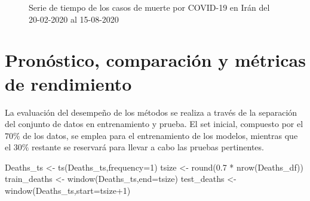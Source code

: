 \documentclass[
  us-letterpaper,
]{scrreprt}
\newenvironment{Shaded}{\begin{snugshade}}{\end{snugshade}}
\newcommand{\AttributeTok}[1]{\textcolor[rgb]{0.40,0.45,0.13}{#1}}
\newcommand{\DecValTok}[1]{\textcolor[rgb]{0.68,0.00,0.00}{#1}}
\newcommand{\FloatTok}[1]{\textcolor[rgb]{0.68,0.00,0.00}{#1}}
\newcommand{\FunctionTok}[1]{\textcolor[rgb]{0.28,0.35,0.67}{#1}}
\newcommand{\NormalTok}[1]{\textcolor[rgb]{0.00,0.23,0.31}{#1}}
\newcommand{\OtherTok}[1]{\textcolor[rgb]{0.00,0.23,0.31}{#1}}
\newcommand{\SpecialCharTok}[1]{\textcolor[rgb]{0.37,0.37,0.37}{#1}}
\theoremstyle{plain}
\theoremstyle{definition}
\theoremstyle{plain}
\theoremstyle{definition}
\theoremstyle{remark}
\begin{document}
\begin{figure}


\caption{\label{fig-muertespdf}Serie de tiempo de los casos de muerte
por COVID-19 en Irán del 20-02-2020 al 15-08-2020}

\end{figure}%

\section{Pronóstico, comparación y métricas de
rendimiento}\label{pronuxf3stico-comparaciuxf3n-y-muxe9tricas-de-rendimiento}

La evaluación del desempeño de los métodos se realiza a través de la
separación del conjunto de datos en entrenamiento y prueba. El set
inicial, compuesto por el \(70\%\) de los datos, se emplea para el
entrenamiento de los modelos, mientras que el \(30\%\) restante se
reservará para llevar a cabo las pruebas pertinentes.

\begin{Shaded}
\begin{Highlighting}[]
\NormalTok{Deaths\_ts }\OtherTok{\textless{}{-}} \FunctionTok{ts}\NormalTok{(Deaths\_ts,}\AttributeTok{frequency=}\DecValTok{1}\NormalTok{) }
\NormalTok{tsize }\OtherTok{\textless{}{-}} \FunctionTok{round}\NormalTok{(}\FloatTok{0.7} \SpecialCharTok{*} \FunctionTok{nrow}\NormalTok{(Deaths\_df)) }
\NormalTok{train\_deaths }\OtherTok{\textless{}{-}} \FunctionTok{window}\NormalTok{(Deaths\_ts,}\AttributeTok{end=}\NormalTok{tsize) }
\NormalTok{test\_deaths }\OtherTok{\textless{}{-}} \FunctionTok{window}\NormalTok{(Deaths\_ts,}\AttributeTok{start=}\NormalTok{tsize}\SpecialCharTok{+}\DecValTok{1}\NormalTok{)}
\end{Highlighting}
\end{Shaded}
\end{document}
